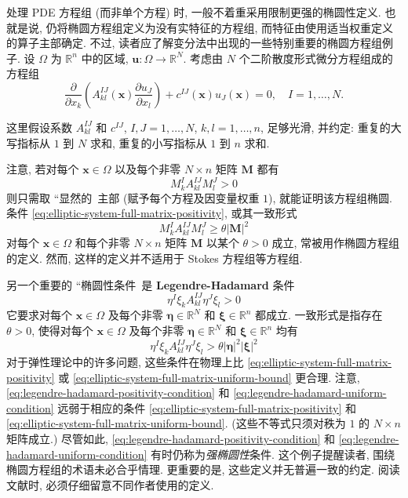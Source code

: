 处理 PDE 方程组 (而非单个方程) 时, 一般不着重采用限制更强的椭圆性定义. 也就是说, 仍将椭圆方程组定义为没有实特征的方程组, 而特征由使用适当权重定义的算子主部确定. 不过, 读者应了解变分法中出现的一些特别重要的椭圆方程组例子. 设 $\Omega$ 为 $\mathbb{R}^n$ 中的区域, $\bm{u}:\Omega\to\mathbb{R}^N$. 考虑由 $N$ 个二阶散度形式微分方程组成的方程组
\begin{equation}\label{eq:second-order-divergence-system-definition}
\frac{\partial}{\partial x_k}\left(A_{kl}^{IJ}(\bm{x})\frac{\partial u_J}{\partial x_l}\right)+c^{IJ}(\bm{x})u_J(\bm{x})=0,\quad I=1,\ldots,N.
\end{equation}


这里假设系数 $A_{kl}^{IJ}$ 和 $c^{IJ}$, $I,J=1,\ldots,N$, $k,l=1,\ldots,n$, 足够光滑, 并约定: 重复的大写指标从 $1$ 到 $N$ 求和, 重复的小写指标从 $1$ 到 $n$ 求和.

注意, 若对每个 $\bm{x}\in\Omega$ 以及每个非零 $N\times n$ 矩阵 $\bm{M}$ 都有
\begin{equation}\label{eq:elliptic-system-full-matrix-positivity}
M_k^IA_{kl}^{IJ}M_l^J>0
\end{equation}
则只需取 ``显然的\textquotesingle\textquotesingle\ 主部 (赋予每个方程及因变量权重 $1$), 就能证明该方程组椭圆. 条件 \eqref{eq:elliptic-system-full-matrix-positivity}, 或其一致形式
\begin{equation}\label{eq:elliptic-system-full-matrix-uniform-bound}
M_k^IA_{kl}^{IJ}M_l^J\geq\theta|\bm{M}|^2
\end{equation}
对每个 $\bm{x}\in\Omega$ 和每个非零 $N\times n$ 矩阵 $\bm{M}$ 以某个 $\theta>0$ 成立, 常被用作椭圆方程组的定义. 然而, 这样的定义并不适用于 Stokes 方程组等方程组.

另一个重要的 ``椭圆性条件\textquotesingle\textquotesingle\ 是 \textbf{Legendre-Hadamard} 条件
\begin{equation}\label{eq:legendre-hadamard-positivity-condition}
\eta^I\xi_kA_{kl}^{IJ}\eta^J\xi_l>0
\end{equation}
它要求对每个 $\bm{x}\in\Omega$ 及每个非零 $\bm{\eta}\in\mathbb{R}^N$ 和 $\bm{\xi}\in\mathbb{R}^n$ 都成立. 一致形式是指存在 $\theta>0$, 使得对每个 $\bm{x}\in\Omega$ 及每个非零 $\bm{\eta}\in\mathbb{R}^N$ 和 $\bm{\xi}\in\mathbb{R}^n$ 均有
\begin{equation}\label{eq:legendre-hadamard-uniform-condition}
\eta^I\xi_kA_{kl}^{IJ}\eta^J\xi_l>\theta|\bm{\eta}|^2|\bm{\xi}|^2
\end{equation}
对于弹性理论中的许多问题, 这些条件在物理上比 \eqref{eq:elliptic-system-full-matrix-positivity} 或 \eqref{eq:elliptic-system-full-matrix-uniform-bound} 更合理. 注意, \eqref{eq:legendre-hadamard-positivity-condition} 和 \eqref{eq:legendre-hadamard-uniform-condition} 远弱于相应的条件 \eqref{eq:elliptic-system-full-matrix-positivity} 和 \eqref{eq:elliptic-system-full-matrix-uniform-bound}. (这些不等式只须对秩为 $1$ 的 $N\times n$ 矩阵成立.) 尽管如此, \eqref{eq:legendre-hadamard-positivity-condition} 和 \eqref{eq:legendre-hadamard-uniform-condition} 有时仍称为\emph{强椭圆性}条件. 这个例子提醒读者, 围绕椭圆方程组的术语未必合乎情理. 更重要的是, 这些定义并无普遍一致的约定. 阅读文献时, 必须仔细留意不同作者使用的定义.
